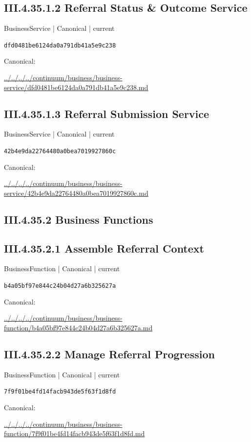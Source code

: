 \documentclass[10pt,a4paper]{article}
\begin{document}
\subsection*{III.4.35.1.2 Referral Status \& Outcome Service}
{\small BusinessService | Canonical | current}\par
\texttt{dfd0481be6124da0a791db41a5e9c238}\par
Canonical: \par
{\footnotesize\url{../../../../continuum/business/business-service/dfd0481be6124da0a791db41a5e9c238.md}}\par
\subsection*{III.4.35.1.3 Referral Submission Service}
{\small BusinessService | Canonical | current}\par
\texttt{42b4e9da22764480a0bea7019927860c}\par
Canonical: \par
{\footnotesize\url{../../../../continuum/business/business-service/42b4e9da22764480a0bea7019927860c.md}}\par
\subsection*{III.4.35.2 Business Functions}
\subsection*{III.4.35.2.1 Assemble Referral Context}
{\small BusinessFunction | Canonical | current}\par
\texttt{b4a05bf97e844c24b04d27a6b325627a}\par
Canonical: \par
{\footnotesize\url{../../../../continuum/business/business-function/b4a05bf97e844c24b04d27a6b325627a.md}}\par
\subsection*{III.4.35.2.2 Manage Referral Progression}
{\small BusinessFunction | Canonical | current}\par
\texttt{7f9f01be4fd14facb943de5f63f1d8fd}\par
Canonical: \par
{\footnotesize\url{../../../../continuum/business/business-function/7f9f01be4fd14facb943de5f63f1d8fd.md}}\par
\end{document}
